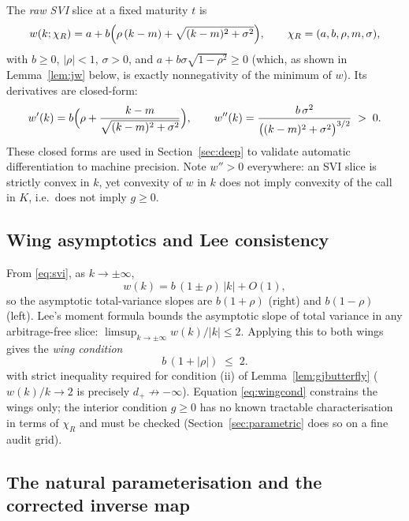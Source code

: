 The \emph{raw SVI} slice \cite{gatheral2004} at a fixed maturity $t$ is
\begin{equation}\label{eq:svi}
w(k;\chi_R)=a+b\Bigl(\rho\,(k-m)+\sqrt{(k-m)^2+\sigma^2}\Bigr),
\qquad \chi_R=(a,b,\rho,m,\sigma),
\end{equation}
with $b\ge0$, $|\rho|<1$, $\sigma>0$, and $a+b\sigma\sqrt{1-\rho^2}\ge0$ (which, as shown in
Lemma~\ref{lem:jw} below, is exactly nonnegativity of the minimum of $w$). Its derivatives are
closed-form:
\begin{equation}\label{eq:svideriv}
w'(k)=b\Bigl(\rho+\frac{k-m}{\sqrt{(k-m)^2+\sigma^2}}\Bigr),\qquad
w''(k)=\frac{b\,\sigma^2}{\bigl((k-m)^2+\sigma^2\bigr)^{3/2}}\;>\;0 .
\end{equation}
These closed forms are used in Section~\ref{sec:deep} to validate automatic differentiation to
machine precision. Note $w''>0$ everywhere: an SVI slice is strictly convex in $k$, yet convexity of $w$ in $k$ does not imply convexity of the
call in $K$, i.e.\ does not imply $g\ge0$.

\subsection{Wing asymptotics and Lee consistency}

From \eqref{eq:svi}, as $k\to\pm\infty$,
\begin{equation}\label{eq:sviwings}
w(k)=b\,(1\pm\rho)\,|k|+O(1),
\end{equation}
so the asymptotic total-variance slopes are $b(1+\rho)$ (right) and $b(1-\rho)$ (left). Lee's
moment formula \cite{lee2004} bounds the asymptotic slope of total variance in any
arbitrage-free slice: $\limsup_{k\to\pm\infty} w(k)/|k|\le 2$. Applying this to both wings gives
the \emph{wing condition}
\begin{equation}\label{eq:wingcond}
b\,(1+|\rho|)\;\le\;2 .
\end{equation}
with strict inequality required for condition (ii) of Lemma~\ref{lem:gjbutterfly}
($w(k)/k\to2$ is precisely $d_+\not\to-\infty$). Equation \eqref{eq:wingcond} constrains the
wings only; the interior condition $g\ge0$ has no known tractable characterisation in terms of
$\chi_R$ and must be checked (Section~\ref{sec:parametric} does so on a fine audit grid).

\subsection{The natural parameterisation and the corrected inverse map}

